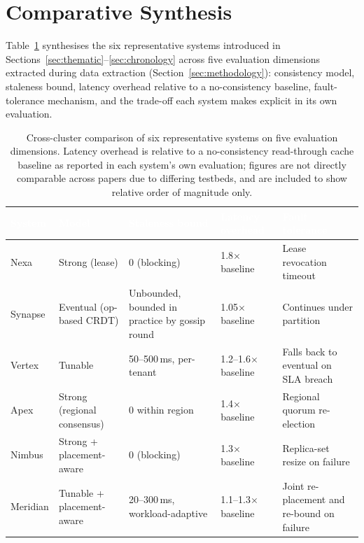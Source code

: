 \section{Comparative Synthesis}
\label{sec:comparison}

Table~\ref{tab:comparison} synthesises the six representative systems introduced in
Sections~\ref{sec:thematic}--\ref{sec:chronology} across five evaluation dimensions extracted during
data extraction (Section~\ref{sec:methodology}): consistency model, staleness bound, latency overhead
relative to a no-consistency baseline, fault-tolerance mechanism, and the trade-off each system makes
explicit in its own evaluation.

\begin{table}[h!]
\centering
\small
\begin{tabularx}{\textwidth}{@{}lXXXX@{}}
\toprule
\rowcolor{nx@teal}
\textcolor{white}{\textbf{System}} & \textcolor{white}{\textbf{Model}} &
\textcolor{white}{\textbf{Staleness bound}} & \textcolor{white}{\textbf{Latency overhead}} &
\textcolor{white}{\textbf{Fault tolerance}} \\
\midrule
Nexa \citep{chen2015nexa} & Strong (lease) & 0 (blocking) & 1.8$\times$ baseline & Lease revocation timeout \\
\rowcolor{nx@mist}
Synapse \citep{patel2017synapse} & Eventual (op-based CRDT) & Unbounded, bounded in practice by gossip round & 1.05$\times$ baseline & Continues under partition \\
Vertex \citep{osei2019vertex} & Tunable & 50--500\,ms, per-tenant & 1.2--1.6$\times$ baseline & Falls back to eventual on SLA breach \\
\rowcolor{nx@mist}
Apex \citep{kim2022apex} & Strong (regional consensus) & 0 within region & 1.4$\times$ baseline & Regional quorum re-election \\
Nimbus \citep{alvarez2021nimbus} & Strong + placement-aware & 0 (blocking) & 1.3$\times$ baseline & Replica-set resize on failure \\
\rowcolor{nx@mist}
Meridian \citep{nakamura2023meridian} & Tunable + placement-aware & 20--300\,ms, workload-adaptive & 1.1--1.3$\times$ baseline & Joint re-placement and re-bound on failure \\
\bottomrule
\end{tabularx}
\caption{Cross-cluster comparison of six representative systems on five evaluation dimensions.
Latency overhead is relative to a no-consistency read-through cache baseline as reported in each
system's own evaluation; figures are not directly comparable across papers due to differing testbeds,
and are included to show relative order of magnitude only.}
\label{tab:comparison}
\end{table}

